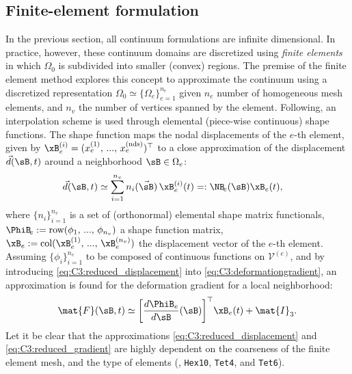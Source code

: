 \subsection{Finite-element formulation}
In the previous section, all continuum formulations are infinite dimensional. In practice, however, these continuum domains are discretized using \textit{finite elements} in which $\Omega_0$ is subdivided into smaller (convex) regions. The premise of the finite element method explores this concept to approximate the continuum using a discretized representation $\Omega_0 \simeq \{\Omega_e \}^{n_e}_{e=1}$ given $n_e$ number of homogeneous mesh elements, and $n_v$ the number of vertices spanned by the element. Following, an interpolation scheme is used through elemental (piece-wise continuous) shape functions. The shape function maps the nodal displacements of the $e$-th element, given by $\xB_{e}^{(i)} = (x_{e}^{(1)},\,...,\,x_{e}^{(\text{nds})})^\top$ to a close approximation of the displacement $\vec{d}(\sB,t)$ around a neighborhood $\sB \in \Omega_e$:
%
\begin{align}
\vec{d}(\sB,t) & \simeq \sum_{i=1}^{n_v} n_{i}(\vec{\sB})\, \xB_{e}^{(i)}(t) =: \NB_{\!e}(\sB) \xB_e(t), %
\label{eq:C3:reduced_displacement}
\end{align}
%
where $\{n_i\}_{i=1}^{n_v}$ is a set of (orthonormal) elemental shape matrix functionals, $\PhiB_{\!e}:= \text{row}(\phi_1,\,...,\,\phi_{n_v})$ a  shape function matrix, $\xB_e := \text{col}(\xB_{e}^{(1)},\,...,\,\xB_{e}^{(n_v)})$ the displacement vector of the $e$-th element. Assuming $\{\phi_i\}_{i=1}^{n_v}$ to be composed of continuous functions on $\mathcal{V}^{(e)}$, and by introducing \eqref{eq:C3:reduced_displacement} into \eqref{eq:C3:deformationgradient}, an approximation is found for the deformation gradient for a local neighborhood:
%
\begin{align}
\mat{F}(\sB,t) \simeq
\left[\frac{d \PhiB_{e} } {d \sB}(\sB)\right]^\top\! \xB_e(t) + \mat{I}_3.
\label{eq:C3:reduced_gradient}
\end{align}
%
Let it be clear that the approximations \eqref{eq:C3:reduced_displacement} and \eqref{eq:C3:reduced_gradient} are highly dependent on the coarseness of the finite element mesh, and the type of elements (\eg, \texttt{Hex10}, \texttt{Tet4}, and \texttt{Tet6}).


